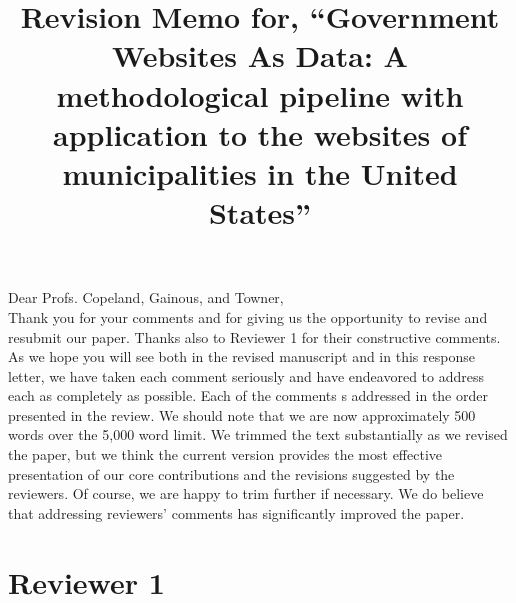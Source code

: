\documentclass[12pt,titlepage]{article}
\title{Revision Memo for, ``Government Websites As Data: A methodological pipeline with application to the websites of municipalities in the United States''}
\begin{document}
\maketitle

Dear Profs. Copeland, Gainous, and Towner,\\

Thank you for your comments and for giving us the opportunity to revise and resubmit our paper. Thanks also to Reviewer 1 for their constructive comments. As we hope you will see both in the revised manuscript and in this response letter, we have taken each comment seriously and have endeavored to address each as completely as possible. Each of the comments s addressed in the order presented in the review.  We should note that we are now approximately 500 words over the 5,000 word limit. We trimmed the text substantially as we revised the paper, but we think the current version provides the most effective presentation of our core contributions and the revisions suggested by the reviewers. Of course, we are happy to trim further if necessary.  We do believe that addressing reviewers' comments has significantly improved the paper. \\

\section*{Reviewer 1}
\end{document}
